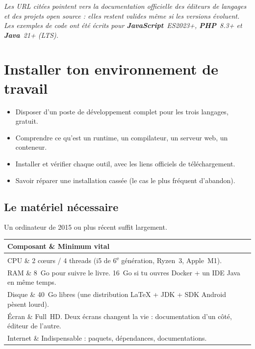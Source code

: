 \documentclass[12pt,a4paper,twoside,openright]{book}
\makeatletter
\newcommand{\langjs}{\textcolor{javared}{\textbf{JavaScript}}}
\newcommand{\langphp}{\textcolor{phppurple}{\textbf{PHP}}}
\newcommand{\langjava}{\textcolor{themecolor}{\textbf{Java}}}
\newenvironment{tabz}[1]{\rowcolors{2}{white}{tralight}%
  \small\setlength{\tabcolsep}{5pt}\setlength{\LTpre}{3pt}\setlength{\LTpost}{3pt}%
  \begin{longtable}{@{}#1@{}}\toprule}
  {\bottomrule\end{longtable}\normalfont\setlength{\tabcolsep}{6pt}}
\newcommand{\thd}[1]{\textbf{\color{white}#1}}
\newcommand{\headrow}{\rowcolor{theadbg}}
\makeatother
\begin{document}
\tableofcontents

\begin{center}
  \begin{minipage}{0.9\textwidth}
    \small\itshape
    Les URL cit\'ees pointent vers la documentation officielle des \'editeurs de langages et des projets
    open source : elles restent valides m\^eme si les versions \'evoluent. Les exemples de code ont \'et\'e
    \'ecrits pour \langjs{}~ES2023+, \langphp{}~8.3+ et \langjava{}~21+ (LTS).
  \end{minipage}
\end{center}

\mainmatter
\chapter{Installer ton environnement de travail}
\label{ch-environnement}

\begin{objectif}
\begin{itemize}
  \item Disposer d'un poste de d\'eveloppement complet pour les trois langages, gratuit.
  \item Comprendre ce qu'est un runtime, un compilateur, un serveur web, un conteneur.
  \item Installer et v\'erifier chaque outil, avec les liens officiels de t\'el\'echargement.
  \item Savoir r\'eparer une installation cass\'ee (le cas le plus fr\'equent d'abandon).
\end{itemize}
\end{objectif}

\section{Le mat\'eriel n\'ecessaire}

Un ordinateur de 2015 ou plus r\'ecent suffit largement.

\begin{tabz}{lX}
  \headrow \thd{Composant} \& \thd{Minimum vital} \\
  \midrule
  CPU \& 2 c\oe{}urs / 4 threads (i5 de 6\textsuperscript{e} g\'en\'eration, Ryzen~3, Apple~M1).\\
  RAM \& 8~Go pour suivre le livre. 16~Go si tu ouvres Docker + un IDE Java en m\^eme temps.\\
  Disque \& 40~Go libres (une distribution \LaTeX{} + JDK + SDK Android p\`esent lourd).\\
  \'Ecran \& Full~HD. Deux \'ecrans changent la vie : documentation d'un c\^ot\'e, \'editeur de l'autre.\\
  Internet \& Indispensable : paquets, d\'ependances, documentations.\\
\end{tabz}
\end{document}
